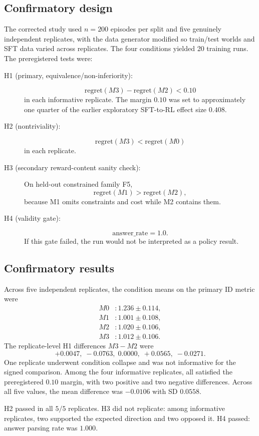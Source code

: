 \documentclass[11pt]{article}
\begin{document}
\subsection{Confirmatory design}
The corrected study used $n=200$ episodes per split and five genuinely independent replicates, with the data generator modified so train/test worlds and SFT data varied across replicates. The four conditions yielded 20 training runs. The preregistered tests were:
\begin{description}
    \item[H1 (primary, equivalence/non-inferiority):]
    \[
    \mathrm{regret}(M3)-\mathrm{regret}(M2)<0.10
    \]
    in each informative replicate. The margin $0.10$ was set to approximately one quarter of the earlier exploratory SFT-to-RL effect size $0.408$.
    \item[H2 (nontriviality):]
    \[
    \mathrm{regret}(M3)<\mathrm{regret}(M0)
    \]
    in each replicate.
    \item[H3 (secondary reward-content sanity check):]
    On held-out constrained family F5,
    \[
    \mathrm{regret}(M1)>\mathrm{regret}(M2),
    \]
    because M1 omits constraints and cost while M2 contains them.
    \item[H4 (validity gate):]
    \[
    \mathrm{answer\_rate}=1.0.
    \]
    If this gate failed, the run would not be interpreted as a policy result.
\end{description}

\subsection{Confirmatory results}
Across five independent replicates, the condition means on the primary ID metric were
\[
\begin{aligned}
M0 &: 1.236\pm0.114,\\
M1 &: 1.001\pm0.108,\\
M2 &: 1.020\pm0.106,\\
M3 &: 1.012\pm0.106.
\end{aligned}
\]
The replicate-level H1 differences $M3-M2$ were
\[
+0.0047,\;-0.0763,\;0.0000,\;+0.0565,\;-0.0271.
\]
One replicate underwent condition collapse and was not informative for the signed comparison. Among the four informative replicates, all satisfied the preregistered $0.10$ margin, with two positive and two negative differences. Across all five values, the mean difference was $-0.0106$ with SD $0.0558$.

H2 passed in all $5/5$ replicates. H3 did not replicate: among informative replicates, two supported the expected direction and two opposed it. H4 passed: answer parsing rate was $1.000$.
\end{document}
